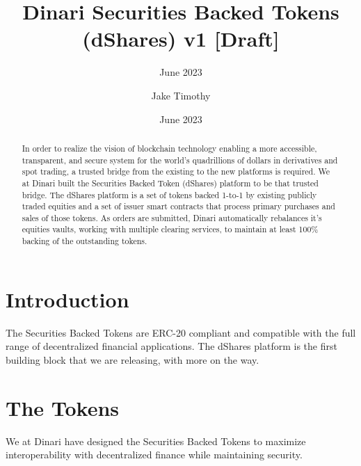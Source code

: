 \documentclass[sigconf,nonacm,prologue,table]{acmart}
\numberwithin{equation}{section}
\theoremstyle{definition}
\theoremstyle{remark}
\begin{document}
\title{Dinari Securities Backed Tokens (dShares) v1 [Draft]}
\subtitle{June 2023}
\date{June 2023}

\author{Jake Timothy}
\affiliation{}

\begin{teaserfigure}
\caption*{
    \hspace{\textwidth}
    }
\end{teaserfigure}

\renewcommand{\shortauthors}{Timothy}

\begin{abstract}

In order to realize the vision of blockchain technology enabling a more accessible, transparent, and secure system for the world’s quadrillions of dollars in derivatives and spot trading, a trusted bridge from the existing to the new platforms is required. We at Dinari built the Securities Backed Token (dShares) platform to be that trusted bridge. The dShares platform is a set of tokens backed 1-to-1 by existing publicly traded equities and a set of issuer smart contracts that process primary purchases and sales of those tokens. As orders are submitted, Dinari automatically rebalances it’s equities vaults, working with multiple clearing services, to maintain at least 100\% backing of the outstanding tokens.

\end{abstract}

\maketitle

\section{Introduction} \label{sec:introduction}

The Securities Backed Tokens are ERC-20 compliant and compatible with the full range of decentralized financial applications. The dShares platform is the first building block that we are releasing, with more on the way.

\section{The Tokens} 
\label{sec:Tokens}

We at Dinari have designed the Securities Backed Tokens to maximize interoperability with decentralized finance while maintaining security.
\end{document}
